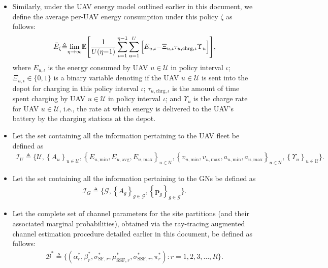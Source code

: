 \documentclass{article}
\begin{document}
\begin{itemize}
    \item Similarly, under the UAV energy model outlined earlier in this document, we define the average per-UAV energy consumption under this policy $\zeta$ as follows:
    \begin{align}\label{Average_energy}
        \Bar{E}_{\zeta}{\triangleq}\underset{\eta{\rightarrow}\infty}{\mathrm{lim}}\mathbb{E}\Bigg[\frac{1}{U(\eta{-}1)}\sum_{\iota{=}1}^{\eta{-}1}\sum_{u{=}1}^{U}\Big[E_{u,\iota}{-}\Xi_{u,\iota}\tau_{u,\mathrm{chrg},\iota}\Upsilon_{u}\Big]\Bigg],
    \end{align}
    where $E_{u,\iota}$ is the energy consumed by UAV $u{\in}\mathcal{U}$ in policy interval $\iota$; $\Xi_{u,\iota}{\in}\{0,1\}$ is a binary variable denoting if the UAV $u{\in}\mathcal{U}$ is sent into the depot for charging in this policy interval $\iota$; $\tau_{u,\mathrm{chrg},\iota}$ is the amount of time spent charging by UAV $u{\in}\mathcal{U}$ in policy interval $\iota$; and $\Upsilon_{u}$ is the charge rate for UAV $u{\in}\mathcal{U}$, i.e., the rate at which energy is delivered to the UAV's battery by the charging stations at the depot.
    \item Let the set containing all the information pertaining to the UAV fleet be defined as
    \begin{align*}
        \mathcal{I}_{U}{\triangleq}\Bigg\{\mathcal{U},\left\{A_{u}\right\}_{u{\in}\mathcal{U}},\left\{E_{u,\mathrm{min}},E_{u,\mathrm{avg}},E_{u,\mathrm{max}}\right\}_{u{\in}\mathcal{U}},\left\{v_{u,\mathrm{min}},v_{u,\mathrm{max}},a_{u,\mathrm{min}},a_{u,\mathrm{max}}\right\}_{u{\in}\mathcal{U}},\left\{\Upsilon_{u}\right\}_{u{\in}\mathcal{U}}\Bigg\}.
    \end{align*}
    \item Let the set containing all the information pertaining to the GNs be defined as
    \begin{align*}
        \mathcal{I}_{G}{\triangleq}\Bigg\{\mathcal{G},\left\{A_{g}\right\}_{g{\in}\mathcal{G}},\left\{\mathbf{p}_{g}\right\}_{g{\in}\mathcal{G}}\Bigg\}.
    \end{align*}
    \item Let the complete set of channel parameters for the site partitions (and their associated marginal probabilities), obtained via the ray-tracing augmented channel estimation procedure detailed earlier in this document, be defined as follows:
    \begin{align*}
        \mathcal{B}^{*}{\triangleq}\Bigg\{\left(\alpha_{r}^{*},\beta_{r}^{*},\sigma_{\mathrm{SF},r}^{*},\mu_{\mathrm{SSF},r}^{*},\sigma_{\mathrm{SSF},r}^{*},\pi_{r}^{*}\right):r{=}1,2,3,{\dots},R\Bigg\}.
    \end{align*}
\end{itemize}
\end{document}
